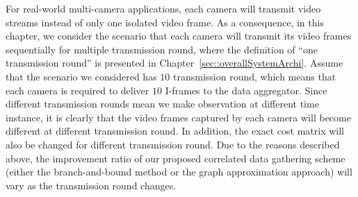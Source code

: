 For real-world multi-camera applications, each camera will transmit video streams instead of only one isolated video frame.
As a consequence, in this chapter, we consider the scenario that each camera will transmit its video frames sequentially for multiple transmission round, where the definition of ``one transmission round'' is presented in Chapter~\ref{sec::overallSystemArchi}.
Assume that the scenario we considered has $10$ transmission round, which means that each camera is required to deliver $10$ I-frames to the data aggregator.
Since different transmission rounds mean we make observation at different time instance, it is clearly that the video frames captured by each camera will become different at different transmission round.
In addition, the exact cost matrix will also be changed for different transmission round.
Due to the reasons described above, the improvement ratio of our proposed correlated data gathering scheme (either the branch-and-bound method or the graph approximation approach) will vary as the transmission round changes.

